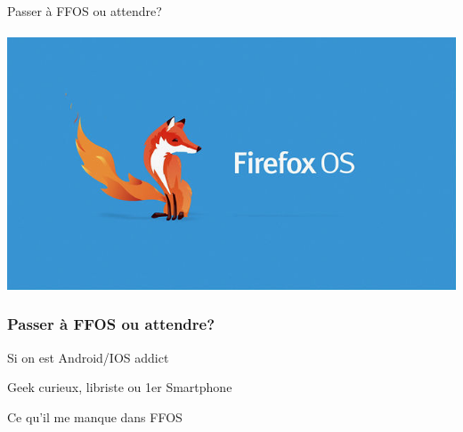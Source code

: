 \documentclass{beamer}
\begin{document}
\begin{frame}
\begin{center}
\Huge{Passer à FFOS ou attendre?}
\\~\\
\includegraphics[scale=0.3]{./images/firefox-os.jpg}
\end{center}
\end{frame}

\begin{frame}
\frametitle{Passer à FFOS ou attendre?}
\begin{block}{Si on est Android/IOS addict}
\end{block}

\begin{block}{Geek curieux, libriste ou 1er Smartphone}
\begin{itemize}
\end{itemize}
\end{block}

\begin{block}{Ce qu'il me manque dans FFOS}
\begin{itemize}
\end{itemize}
\end{block}
\end{frame}
\end{document}
